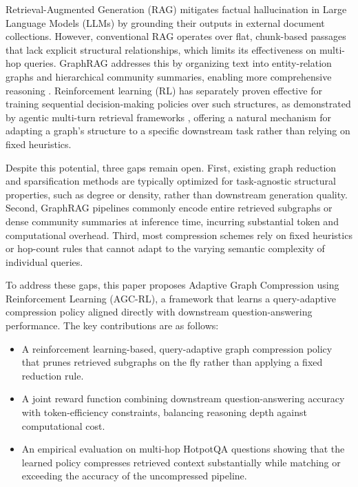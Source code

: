 \documentclass[conference]{IEEEtran}
\begin{document}
Retrieval-Augmented Generation (RAG) mitigates factual hallucination in Large Language Models (LLMs) by grounding their outputs in external document collections. However, conventional RAG operates over flat, chunk-based passages that lack explicit structural relationships, which limits its effectiveness on multi-hop queries. GraphRAG addresses this by organizing text into entity-relation graphs and hierarchical community summaries, enabling more comprehensive reasoning \cite{edge2024local}. Reinforcement learning (RL) has separately proven effective for training sequential decision-making policies over such structures, as demonstrated by agentic multi-turn retrieval frameworks \cite{luo2026graphr1}, offering a natural mechanism for adapting a graph's structure to a specific downstream task rather than relying on fixed heuristics.

Despite this potential, three gaps remain open. First, existing graph reduction and sparsification methods are typically optimized for task-agnostic structural properties, such as degree or density, rather than downstream generation quality. Second, GraphRAG pipelines commonly encode entire retrieved subgraphs or dense community summaries at inference time, incurring substantial token and computational overhead. Third, most compression schemes rely on fixed heuristics or hop-count rules that cannot adapt to the varying semantic complexity of individual queries.

To address these gaps, this paper proposes Adaptive Graph Compression using Reinforcement Learning (AGC-RL), a framework that learns a query-adaptive compression policy aligned directly with downstream question-answering performance. The key contributions are as follows:

\begin{itemize}
    \item A reinforcement learning-based, query-adaptive graph compression policy that prunes retrieved subgraphs on the fly rather than applying a fixed reduction rule.
    \item A joint reward function combining downstream question-answering accuracy with token-efficiency constraints, balancing reasoning depth against computational cost.
    \item An empirical evaluation on multi-hop HotpotQA questions showing that the learned policy compresses retrieved context substantially while matching or exceeding the accuracy of the uncompressed pipeline.
\end{itemize}
\end{document}
